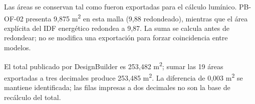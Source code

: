 Las áreas se conservan tal como fueron exportadas para el cálculo lumínico. PB-OF-02 presenta 9,875 m\textsuperscript{2} en esta malla (9,88 redondeado), mientras que el área explícita del IDF energético redondea a 9,87. La suma se calcula antes de redondear; no se modifica una exportación para forzar coincidencia entre modelos.

El total publicado por DesignBuilder es 253,482 m\textsuperscript{2}; sumar las 19 áreas exportadas a tres decimales produce 253,485 m\textsuperscript{2}. La diferencia de 0,003 m\textsuperscript{2} se mantiene identificada; las filas impresas a dos decimales no son la base de recálculo del total.
